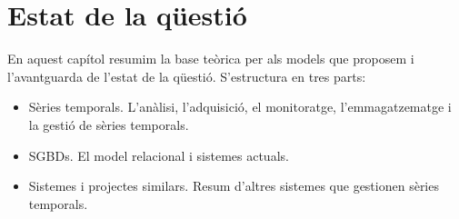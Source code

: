 \chapter{Estat de la qüestió} 
\label{cap:estat}


En aquest capítol resumim la base teòrica per als models que proposem
i l'avantguarda de l'estat de la qüestió. S'estructura en tres parts:

\begin{itemize}

\item Sèries temporals. L'anàlisi, l'adquisició, el monitoratge,
  l'emmagatzematge i la gestió de sèries temporals.

\item \Glspl{SGBD}. El model relacional i sistemes
  actuals.

\item Sistemes i projectes similars. Resum d'altres sistemes que gestionen
  sèries temporals.

\end{itemize}


















  
















